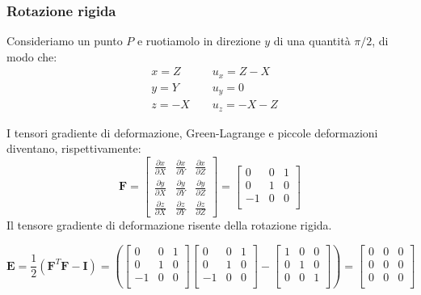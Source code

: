 \subsubsection*{Rotazione rigida}


Consideriamo un punto $P$ e ruotiamolo in direzione $y$ di una quantità $\pi/ 2$, di modo che:
\begin{align*}
    &x = Z \quad\quad &u_x = Z-X\\
    &y = Y    &   u_y = 0\\
    &z = -X &u_z = -X-Z
\end{align*}

I tensori gradiente di deformazione, Green-Lagrange e piccole deformazioni diventano, rispettivamente: 
\begin{equation*}
\boldsymbol{F} = 
\begin{bmatrix}
\frac{\partial x}{\partial X} & \frac{\partial x}{\partial Y} & \frac{\partial x}{\partial Z} \\
\frac{\partial y}{\partial X} & \frac{\partial y}{\partial Y} & \frac{\partial y}{\partial Z} \\
\frac{\partial z}{\partial X} & \frac{\partial z}{\partial Y} & \frac{\partial z}{\partial Z}
\end{bmatrix} = 
\begin{bmatrix}
   0 & 0 & 1 \\
   0 & 1 & 0 \\
   -1 & 0 & 0 \\
\end{bmatrix}
\end{equation*}
Il tensore gradiente di deformazione risente della rotazione rigida.




 \begin{equation*}
\boldsymbol{E} = \frac{1}{2} \left(\boldsymbol{F}^T \boldsymbol{F} - \boldsymbol{I}\right)
= \left(\begin{bmatrix}
   0 & 0 & 1 \\
   0 & 1 & 0 \\
   -1 & 0 & 0 \\
\end{bmatrix}
\begin{bmatrix}
   0 & 0 & 1 \\
   0 & 1 & 0 \\
   -1 & 0 & 0 \\
\end{bmatrix}-
\begin{bmatrix}
   1 & 0 & 0 \\
   0 & 1 & 0 \\
   0 & 0 & 1 \\
\end{bmatrix}\right) =
\begin{bmatrix}
   0 & 0 & 0 \\
   0 & 0 & 0 \\
   0 & 0 & 0 \\
\end{bmatrix}
\end{equation*}

